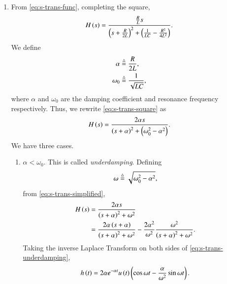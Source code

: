 \documentclass[journal,12pt,twocolumn]{IEEEtran}
\begin{document}
\begin{enumerate}[label=\theenumi.]
    \item From \eqref{eq:s-trans-func}, completing the square,
    \begin{equation}
        H\left(s\right) = \frac{\frac{R}{L}s}{\left(s + \frac{R}{2L}\right)^2 + \left(\frac{1}{LC} - \frac{R^2}{4L^2}\right)}.
        \label{eq:s-trans-square}
    \end{equation}
    We define
    \begin{align}
        \alpha &\stackrel{\triangle}{=} \frac{R}{2L}, \label{eq:alpha-def} \\
        \omega_0 &\stackrel{\triangle}{=} \frac{1}{\sqrt{LC}}, \label{eq:omega-0-def} \\
    \end{align}
    where \(\alpha\) and \(\omega_0\) are the damping coefficient and resonance
    frequency respectively. Thus, we rewrite \eqref{eq:s-trans-square} as
    \begin{equation}
        H\left(s\right) = \frac{2\alpha{}s}{\left(s + \alpha\right)^2 + \left(\omega_0^2-\alpha^2\right)}.
        \label{eq:s-trans-simplified}
    \end{equation}
    We have three cases.
    \begin{enumerate}
        \item \(\alpha < \omega_0\). This is called \emph{underdamping}.
        Defining
        \begin{equation}
            \omega \stackrel{\triangle}{=} \sqrt{\omega_0^2-\alpha^2}, \label{eq:omega-def}
        \end{equation}
        from \eqref{eq:s-trans-simplified},
        \begin{align}
            H\left(s\right) &= \frac{2\alpha{}s}{\left(s+\alpha\right)^2 + \omega^2} \label{eq:H-s-underdamping} \\ 
            &= \frac{2\alpha\left(s + \alpha\right)}{\left(s + \alpha\right)^2 + \omega^2} - \frac{2\alpha^2}{\omega^2}\frac{\omega^2}{\left(s+\alpha\right)^2 + \omega^2}.
            \label{eq:s-trans-underdamping}
        \end{align}
        Taking the inverse Laplace Transform on both sides of
        \eqref{eq:s-trans-underdamping},
        \begin{equation}
            h\left(t\right) = 2\alpha{}e^{-\alpha{}t}u\left(t\right)\left(\cos{\omega{}t} - \frac{\alpha}{\omega^2}\sin{\omega{}t}\right).
            \label{eq:h-t-underdamping}
        \end{equation}


\end{enumerate}
\end{enumerate}
\end{document}
